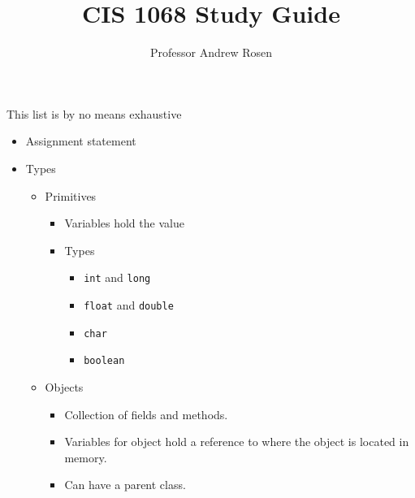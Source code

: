 \documentclass[]{article}
\title{CIS 1068 Study Guide}
\author{Professor Andrew Rosen}
\begin{document}
\maketitle
This list is by no means exhaustive


\begin{itemize}
	\item Assignment statement
	\item Types
	\begin{itemize}
		\item Primitives
		\begin{itemize}
			\item Variables hold the value
			\item Types
			\begin{itemize}
				\item \texttt{int} and \texttt{long}
				\item \texttt{float} and \texttt{double}
				\item \texttt{char}
				\item \texttt{boolean}
			\end{itemize}
		\end{itemize}
		\item Objects
		\begin{itemize}
			\item Collection of fields and methods.
			\item Variables for object hold a reference to where the object is located in memory.
			\item Can have a parent class.
			

\end{itemize}
\end{itemize}
\end{itemize}
\end{document}
